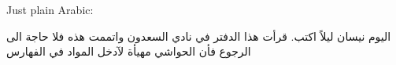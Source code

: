 \documentclass{article}
\begin{document}
Just plain Arabic:
\ \\

\begin{Arabic}
اليوم نيسان ليلاً اكتب. قرأت هذا الدفتر في نادي السعدون واتممت هذه فلا حاجة الى الرجوع فأن الحواشي مهيأة لآدخل المواد في الفهارس
\end{Arabic}
\ \\
\end{document}

